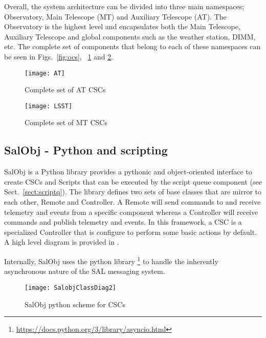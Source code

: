 Overall, the system architecture can be divided into three main namespaces; Observatory, Main Telescope (MT) and Auxiliary Telescope (AT). The Observatory is the highest level and encapsulates both the Main Telescope, Auxiliary Telescope and global components such as the weather station, DIMM, etc. The complete set of components that belong to each of these namespaces can be seen in Figs.~\ref{fig:ocs}, ~\ref{fig:atcscs} and \ref{fig:mtcscs}.

\begin{figure}
\begin{center}
\texttt{[image: AT]}
\caption{Complete set of AT CSCs\label{fig:atcscs}}
\end{center}
\end{figure}

\begin{figure}
\begin{center}
\texttt{[image: LSST]}
\caption{Complete set of MT CSCs\label{fig:mtcscs}}
\end{center}
\end{figure}

\subsection{SalObj - Python and scripting }\label{sect:salobj}
SalObj is a Python library provides a pythonic and object-oriented interface to create CSCs and Scripts that can be executed by the script queue component (see Sect.~\ref{sect:scriptq}). The library defines two sets of base classes that are mirror to each other, Remote and Controller. A Remote will send commands to and receive telemetry and events from a specific component whereas a Controller will receive commands and publish telemetry and events. In this framework, a CSC is a specialized Controller that is configure to perform some basic actions by default. A high level diagram is provided in .

Internally, SalObj uses the python library \asyncio\footnote{\url{https://docs.python.org/3/library/asyncio.html}} to handle the inherently asynchronous nature of the SAL messaging system. 

\begin{figure}
\begin{center}
\texttt{[image: SalobjClassDiag2]}
\caption{SalObj python scheme for  CSCs\label{fig:salobj}}
\end{center}
\end{figure}

